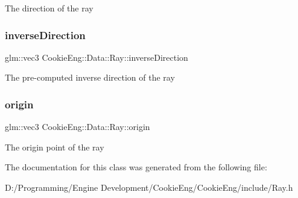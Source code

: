 The direction of the ray \mbox{\label{struct_cookie_eng_1_1_data_1_1_ray_a298fe1967f5d951f5b2e897e52da8519}} 
\subsubsection{\texorpdfstring{inverse\+Direction}{inverseDirection}}
{\footnotesize\ttfamily glm\+::vec3 Cookie\+Eng\+::\+Data\+::\+Ray\+::inverse\+Direction}

The pre-\/computed inverse direction of the ray \mbox{\label{struct_cookie_eng_1_1_data_1_1_ray_ac5a0fd9b0d2466d33a6c6c757ac1fec8}} 
\subsubsection{\texorpdfstring{origin}{origin}}
{\footnotesize\ttfamily glm\+::vec3 Cookie\+Eng\+::\+Data\+::\+Ray\+::origin}

The origin point of the ray 

The documentation for this class was generated from the following file\+:\begin{DoxyCompactItemize}
\item 
D\+:/\+Programming/\+Engine Development/\+Cookie\+Eng/\+Cookie\+Eng/include/Ray.\+h\end{DoxyCompactItemize}
